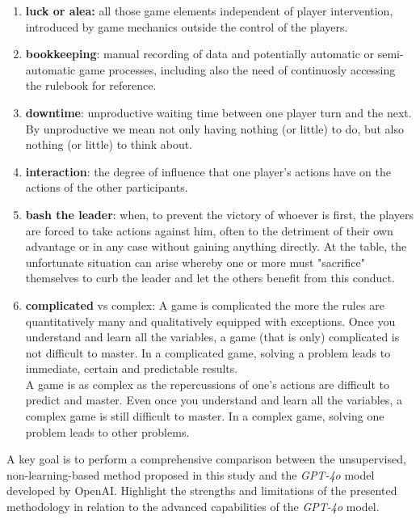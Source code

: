 \documentclass[sn-mathphys-num]{sn-jnl}%
\theoremstyle{thmstyleone}%
\theoremstyle{thmstyletwo}%
\theoremstyle{thmstylethree}%
\begin{document}
    \begin{enumerate}
        \item \textbf{luck or alea:} all those game elements independent of player intervention, introduced by game mechanics outside the control of the players.
        \item \textbf{bookkeeping}: manual recording of data and potentially automatic or semi-automatic game processes, including also the need of continuosly accessing the rulebook for reference.
        \item \textbf{downtime}: unproductive waiting time between one player turn and the next. By unproductive we mean not only having nothing (or little) to do, but also nothing (or little) to think about.
        \item \textbf{interaction}: the degree of influence that one player's actions have on the actions of the other participants.
        \item \textbf{bash the leader}: when, to prevent the victory of whoever is first, the players are forced to take actions against him, often to the detriment of their own advantage or in any case without gaining anything directly. At the table, the unfortunate situation can arise whereby one or more must "sacrifice" themselves to curb the leader and let the others benefit from this conduct.
        \item \textbf{complicated} vs complex: A game is complicated the more the rules are quantitatively many and qualitatively equipped with exceptions. Once you understand and learn all the variables, a game (that is only) complicated is not difficult to master. In a complicated game, solving a problem leads to immediate, certain and predictable results.\\A game is as complex as the repercussions of one's actions are difficult to predict and master. Even once you understand and learn all the variables, a complex game is still difficult to master. In a complex game, solving one problem leads to other problems.
    \end{enumerate}
    A key goal is to perform a comprehensive comparison between the unsupervised, non-learning-based method proposed in this study and the \textit{GPT-4o} model developed by OpenAI. Highlight the strengths and limitations of the presented methodology in relation to the advanced capabilities of the \textit{GPT-4o} model.
\end{document}
